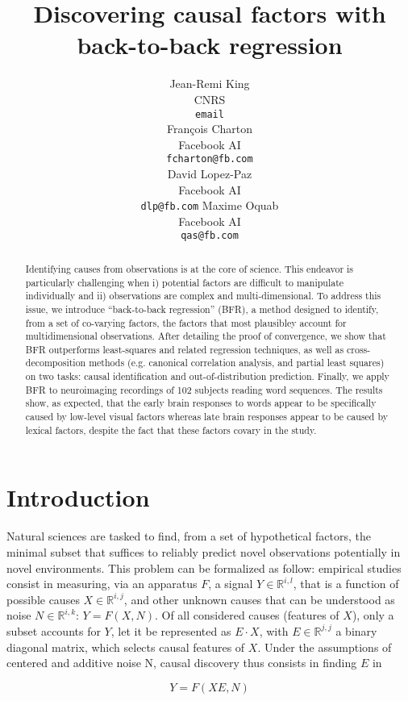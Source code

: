 \documentclass{article}
\title{Discovering causal factors with back-to-back regression}
\author{%
  Jean-Remi King\\
  CNRS\\
  \texttt{email} \\
  \And
  Fran\c{c}ois Charton\\
  Facebook AI\\
  \texttt{fcharton@fb.com}\\
  \And
  David Lopez-Paz\\
  Facebook AI\\
  \texttt{dlp@fb.com}
  \And
  Maxime Oquab\\
  Facebook AI\\
  \texttt{qas@fb.com}
}
\begin{document}
\maketitle

\begin{abstract}
Identifying causes from observations is at the core of science. This endeavor
is particularly challenging when i) potential factors are difficult to
manipulate individually and ii) observations are complex and multi-dimensional.
To address this issue, we introduce ``back-to-back regression'' (BFR), a
method designed to identify, from a set of co-varying factors, the factors
that most plausibley account for multidimensional observations. After detailing
the proof of convergence, we show that BFR outperforms least-squares and related
regression techniques, as well as cross-decomposition methods (e.g. canonical
correlation analysis, and partial least squares) on two tasks: causal
identification and out-of-distribution prediction. Finally, we apply BFR to
neuroimaging recordings of 102 subjects reading word sequences. The results
show, as expected, that the early brain responses to words appear to be
specifically caused by low-level visual factors whereas late brain responses
appear to be caused by lexical factors, despite the fact that these factors
covary in the study.
\end{abstract}

\section{Introduction}

Natural sciences are tasked to find, from a set of hypothetical factors, the minimal subset that suffices to reliably predict novel observations potentially in novel environments.
%
This problem can be formalized as follow: empirical studies consist in measuring, via an apparatus $F$, a signal $Y \in \mathbb{R}^{i, l}$, that is a function of possible causes $X \in \mathbb{R}^{i, j}$, and other unknown causes that can be understood as noise $N \in \mathbb{R}^{i, k}$: $Y=F(X,N)$. Of all considered causes (features of $X$), only a subset accounts for $Y$, let it be represented as $E \cdot X$, with $E \in \mathbb{R}^{j, j}$ a binary diagonal matrix, which selects causal features of $X$.
%
Under the assumptions of centered and additive noise N, causal discovery thus consists in finding $E$ in

\begin{equation}
    Y=F(XE, N)
\end{equation}
\end{document}
